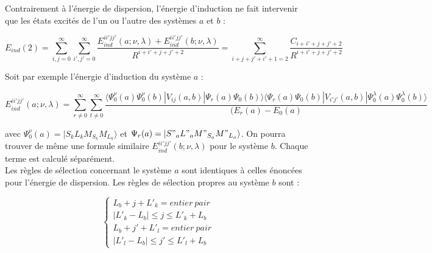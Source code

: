 	Contrairement à l'énergie de dispersion, l'énergie d'induction ne fait intervenir que les états excités de l'un ou l'autre des systèmes $a$ et $b$ : 
	
	\begin{equation}
	E_{ind}(2) = \sum_{i,j=0}^{\infty} \sum_{i',j'=0}^{\infty} \frac{E_{ind}^{ii'jj'} (a; \nu , \lambda) + E_{ind}^{ii'jj'} (b; \nu , \lambda)}{R^{i+i'+j+j'+2}} = \sum_{i+j+j'+i'+1=2}^{\infty} \frac{C_{i+i'+j+j'+2}}{R^{i+i'+j+j'+2}} \label{2.42}
	\end{equation}
	
	Soit par exemple l'énergie d'induction du système $a$ :
	
	\begin{equation}
	E_{ind}^{ii'jj'} (a;\nu , \lambda) = \sum_{r \neq 0}^{\infty} \sum_{t\neq 0}^{\infty} \frac{\langle \Psi_{0}^{\nu} (a) \Psi_{0}^{\nu} (b) |V_{ij} (a,b)|\Psi_{r} (a) \Psi_{0} (b) \rangle  \langle \Psi_{r} (a)\Psi_{0} (b) |V_{i'j'} (a,b)|\Psi_{0}^{\lambda} (a) \Psi_{0}^{\lambda}(b) \rangle}{(E_{r} (a) - E_{0}(a)}
	\end{equation}
	
	\noindent avec $\Psi_{0}^{\nu} (a) = |S_{k} L_{k} M_{S_{k}} M_{L_{k}}\rangle$ et $\Psi_{r}(a) = |S"_{a} L"_{a} M"_{S_{a}} M"_{L_{a}}\rangle$. On pourra trouver de même une formule similaire $E_{ind}^{ii'jj'} (b;\nu , \lambda)$ pour le système $b$. Chaque terme est calculé séparément.\\
	
	Les règles de sélection concernant le système $a$ sont identiques à celles énoncées pour l'énergie de dispersion.
	Les règles de sélection propres au système $b$ sont : 
	
	\begin{equation}
	\begin{cases}
	L_{b} + j + L'_{k} = entier\ pair \\
	|L'_{k} - L_{b}| \leq j \leq L'_{k} + L_{b} \\
	L_{b} + j' + L'_{l} = entier\ pair \\
	|L'_{l} - L_{b}| \leq j' \leq L'_{l} + L_{b}
	\end{cases}
	\end{equation}
	
